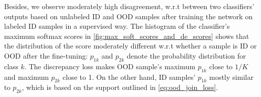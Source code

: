 \hspace*{3.5mm} Besides, we observe moderately high disagreement, w.r.t between two classifiers' outputs based on unlabeled ID and OOD samples after training the network on labeled ID samples in a supervised way. The histogram of the classifier's maximum softmax scores in \cref{fig:max_soft_scores_and_de_scores} shows that the distribution of the score moderately different w.r.t whether a sample is ID or OOD after the fine-tuning: $p_{1k}$ and $p_{2k}$ denote the probability distribution for class $k$. The discrepancy loss makes OOD sample's maximum $p_{1k}$ close to $1/K$ and maximum $p_{2k}$ close to 1. On the other hand, ID samples' $p_{1k}$ mostly similar to $p_{2k}$, which is based on the support outlined in \cref{eq:ood_join_loss}.


